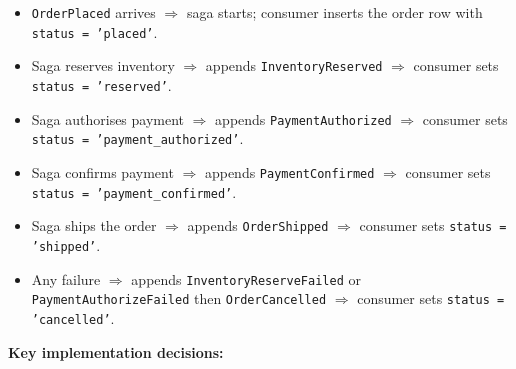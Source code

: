 \documentclass[11pt,a4paper]{article}
\newcommand{\code}[1]{\texttt{\small #1}}
\begin{document}
\begin{itemize}
  \item \code{OrderPlaced} arrives $\Rightarrow$ saga starts; consumer inserts the
        order row with \code{status = 'placed'}.
  \item Saga reserves inventory $\Rightarrow$ appends \code{InventoryReserved}
        $\Rightarrow$ consumer sets \code{status = 'reserved'}.
  \item Saga authorises payment $\Rightarrow$ appends \code{PaymentAuthorized}
        $\Rightarrow$ consumer sets \code{status = 'payment\_authorized'}.
  \item Saga confirms payment $\Rightarrow$ appends \code{PaymentConfirmed}
        $\Rightarrow$ consumer sets \code{status = 'payment\_confirmed'}.
  \item Saga ships the order $\Rightarrow$ appends \code{OrderShipped}
        $\Rightarrow$ consumer sets \code{status = 'shipped'}.
  \item Any failure $\Rightarrow$ appends \code{InventoryReserveFailed} or
        \code{PaymentAuthorizeFailed} then \code{OrderCancelled}
        $\Rightarrow$ consumer sets \code{status = 'cancelled'}.
\end{itemize}

\textbf{Key implementation decisions:}
\end{document}

